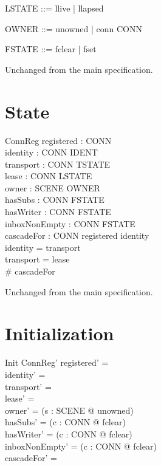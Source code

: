 \documentclass[a4paper,10pt,fleqn]{article}
\begin{document}
\begin{zed}
  LSTATE ::= llive | llapsed
\end{zed}

\begin{zed}
  OWNER ::= unowned | conn \ldata CONN \rdata
\end{zed}

\begin{zed}
  FSTATE ::= fclear | fset
\end{zed}

Unchanged from the main specification.

\section{State}

\begin{schema}{ConnReg}
  registered : \power CONN \\
  identity : CONN \pfun IDENT \\
  transport : CONN \pfun TSTATE \\
  lease : CONN \pfun LSTATE \\
  owner : SCENE \fun OWNER \\
  hasSubs : CONN \fun FSTATE \\
  hasWriter : CONN \fun FSTATE \\
  inboxNonEmpty : CONN \fun FSTATE \\
  cascadeFor : \power CONN
\where
  registered \subseteq \dom identity \\
  \dom identity = \dom transport \\
  \dom transport = \dom lease \\
  \# cascadeFor 
\end{schema}

Unchanged from the main specification.

\section{Initialization}

\begin{schema}{Init}
  ConnReg'
\where
  registered' = \emptyset \\
  identity' = \emptyset \\
  transport' = \emptyset \\
  lease' = \emptyset \\
  owner' = (\lambda s : SCENE @ unowned) \\
  hasSubs' = (\lambda c : CONN @ fclear) \\
  hasWriter' = (\lambda c : CONN @ fclear) \\
  inboxNonEmpty' = (\lambda c : CONN @ fclear) \\
  cascadeFor' = \emptyset
\end{schema}
\end{document}
